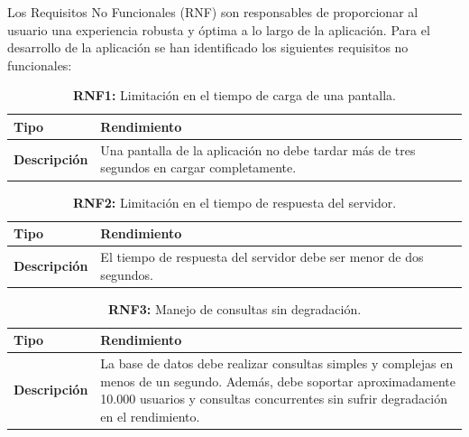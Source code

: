 \documentclass[a4paper, 12pt]{article}
\begin{document}
Los Requisitos No Funcionales (RNF) son responsables de proporcionar al usuario una experiencia robusta y óptima a lo largo de la aplicación. Para el desarrollo de la aplicación se han identificado los siguientes requisitos no funcionales:


\begin{table}[H]
\captionsetup{list=no}%
\captionsetup{justification=raggedright,singlelinecheck=false}
\captionsetup{labelformat=empty}
\caption{\textbf{RNF1:} Limitación en el tiempo de carga de una pantalla.}
\label{tab:RNF1}
    \begin{tabular}{|m{5cm}|m{10cm}|}
	    \hline
	    \textbf{Tipo} & Rendimiento \\ 
	    \hline
	    \textbf{Descripción} & Una pantalla de la aplicación no debe tardar más de tres segundos en cargar completamente. \\ 
	    \hline
    \end{tabular}
\end{table}


\begin{table}[H]
\captionsetup{list=no}%
\captionsetup{justification=raggedright,singlelinecheck=false}
\captionsetup{labelformat=empty}
\caption{\textbf{RNF2:} Limitación en el tiempo de respuesta del servidor.}
\label{tab:RNF2}
    \begin{tabular}{|m{5cm}|m{10cm}|}
	    \hline
	    \textbf{Tipo} & Rendimiento \\ 
	    \hline
	    \textbf{Descripción} & El tiempo de respuesta del servidor debe ser menor de dos segundos. \\ 
	    \hline
    \end{tabular}
\end{table}

\begin{table}[H]
\captionsetup{list=no}%
\captionsetup{justification=raggedright,singlelinecheck=false}
\captionsetup{labelformat=empty}
\caption{\textbf{RNF3:} Manejo de consultas sin degradación.}
\label{tab:RNF3}
    \begin{tabular}{|m{5cm}|m{10cm}|}
	    \hline
	    \textbf{Tipo} & Rendimiento \\ 
	    \hline
	    \textbf{Descripción} & La base de datos debe realizar consultas simples y complejas en menos de un segundo. Además, debe soportar aproximadamente 10.000 usuarios y consultas concurrentes sin sufrir degradación en el rendimiento. \\ 
	    \hline
    \end{tabular}
\end{table}
\end{document}

